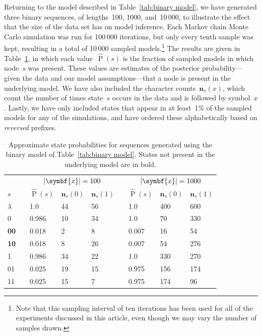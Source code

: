 \documentclass[12pt,a4paper]{article}
\newcommand\ub[1]{\symbf{#1}}                 %
\DeclareMathOperator\Pb{P}                    %
\DeclarePairedDelimiter\abs{\lvert}{\rvert}   %
\begin{document}
Returning to the model described in Table~\ref{tab:binary model}, we have
generated three binary sequences, of lengths~100, 1000, and~10\,000, to
illustrate the effect that the size of the data set has on model inference. Each
Markov chain Monte Carlo simulation was run for 100\,000 iterations, but only
every tenth sample was kept, resulting in a total of 10\,000 sampled
models.\footnote{Note that this sampling interval of ten iterations has been
used for all of the experiments discussed in this article, even though we may
vary the number of samples drawn.} The results are given in
Table~\ref{tab:binary inference}, in which each value~\(\hat{\Pb}(s)\) is the
fraction of sampled models in which node~\(s\) was present. These values are
estimates of the posterior probability---given the data and our model
assumptions---that a node is present in the underlying model. We have also
included the character counts~\(\ub{n}_s(x)\), which count the number of times
state~\(s\) occurs in the data and is followed by symbol~\(x\). Lastly, we have
only included states that appear in at least~1\% of the sampled models for any
of the simulations, and have ordered these alphabetically based on
\emph{reversed} prefixes.
%
\begin{table}[htbp]
\centering
\begin{tabular}{lclllclll}
  \toprule
  && \multicolumn{3}{c}{\(\abs{\ub{x}} = 100\)}
  && \multicolumn{3}{c}{\(\abs{\ub{x}} = 1000\)} \\
  \cmidrule{3-5} \cmidrule{7-9}
  \(s\) && \(\hat{\Pb}(s)\) & \(\ub{n}_s(0)\) & \(\ub{n}_s(1)\)
        && \(\hat{\Pb}(s)\) & \(\ub{n}_s(0)\) & \(\ub{n}_s(1)\) \\
  \midrule
  \(\lambda\) && 1.0   & 44 & 56 && 1.0   & 400 & 600 \\
  0           && 0.986 & 10 & 34 && 1.0   & 70  & 330 \\
  \textbf{00} && 0.018 & 2  & 8  && 0.007 & 16  & 54  \\
  \textbf{10} && 0.018 & 8  & 26 && 0.007 & 54  & 276 \\
  1           && 0.986 & 34 & 22 && 1.0   & 330 & 270 \\
  01          && 0.025 & 19 & 15 && 0.975 & 156 & 174 \\
  11          && 0.025 & 15 & 7  && 0.975 & 174 & 96  \\
  \bottomrule
\end{tabular}
\caption{Approximate state probabilities for sequences generated using the
  binary model of Table~\ref{tab:binary model}. States not present in the
  underlying model are in bold.}
\label{tab:binary inference}
\end{table}
\end{document}
